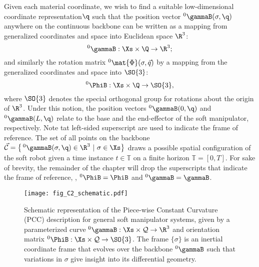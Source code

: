 Given each material coordinate, we wish to find a suitable low-dimensional \editl coordinate representation\editr $\q$ such that the position vector $^0\gammaB(\sigma,\q)$ anywhere on the continuous backbone can be written as a mapping from generalized coordinates and space into Euclidean space $\R^3$:
%
\begin{equation}
^0\gammaB: \Xs \times \Q \to \R^3;
\end{equation}
%
and similarly the rotation matrix $^0\mat{\Phi}(\sigma,\vec{q})$ by a mapping from the generalized coordinates and space into $\SO{3}$:
%
\begin{equation}
^0\PhiB: \Xs \times \Q \to \SO{3}, \label{eq:phi_map}
\end{equation}
%
where {$\SO{3}$ denotes the special orthogonal group for rotations about the origin of $\R^3$}. Under this notion, the position vectors $^0\gammaB(0,\q)$ and $^0\gammaB(L,\q)$ relate to the base and the end-effector of the soft \editl manipulator\editr, respectively. {Note tat left-sided superscript are used to indicate the frame of reference.} The set of all points on the backbone $\vec{\mathcal{C}} = \left\{\,^0\gammaB(\sigma,\q) \in \R^3~|~\sigma \in \Xs \right\}$ draws a possible {spatial} configuration of the soft robot given {a time instance $t \in \mathbb{T}$ on a finite horizon $\mathbb{T} = [0,T]$}. \editl For sake of brevity, the remainder of the chapter will drop the superscripts that indicate the frame of reference, \ie, $^0\PhiB = \PhiB$ and $^0\gammaB = \gammaB$.\editr
%
\begin{figure}[!t]
  \vspace{-3mm}
  \centering
  \texttt{[image: fig\_C2\_schematic.pdf]}
  \caption{Schematic representation of the Piece-wise Constant Curvature (PCC) description for general soft \editl manipulator systems\editr, given by a parameterized curve $^0 \gammaB: \Xs \times \mathcal{Q} \to \R^3$ and orientation matrix $^0 \PhiB: \Xs \times \mathcal{Q} \to \SO{3}$. The frame $\{\sigma\}$ is an inertial coordinate frame that evolves over the backbone $^0 \gammaB$ such that variations in $\sigma$ give insight into its differential geometry.}
  \label{fig:C2:configuration}
\end{figure}
%
